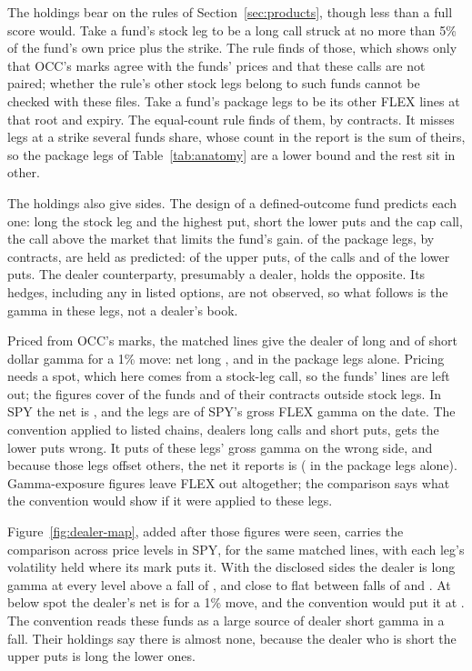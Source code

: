 \documentclass[11pt]{article}
\begin{document}
The holdings bear on the rules of Section~\ref{sec:products}, though less than a full
score would. Take a fund's stock leg to be a long call struck at no more than 5\% of the
fund's own price plus the strike. The rule finds \HoldStockRecall{} of those, which
shows only that OCC's marks agree with the funds' prices and that these calls are not
paired; whether the rule's other stock legs belong to such funds cannot be checked with
these files. Take a fund's package legs to be its other FLEX lines at that root and
expiry. The equal-count rule finds \HoldPackageRecall{} of them, by contracts. It misses
legs at a strike several funds share, whose count in the report is the sum of theirs, so
the package legs of Table~\ref{tab:anatomy} are a lower bound and the rest sit in other.

The holdings also give sides. The design of a defined-outcome fund predicts each one:
long the stock leg and the highest put, short the lower puts and the cap call, the call
above the market that limits the fund's gain. \HoldDesign{} of the package legs, by
contracts, are held as predicted: \HoldDesignUpperPut{} of the upper puts,
\HoldDesignCall{} of the calls and \HoldDesignLowerPut{} of the lower puts. The dealer
counterparty, presumably a dealer, holds the opposite. Its hedges, including any in
listed options, are not observed, so what follows is the gamma in these legs, not a
dealer's book.

Priced from OCC's marks, the matched lines give the dealer \HoldGammaLong{} of long and
\HoldGammaShort{} of short dollar gamma for a 1\% move: net long \HoldGammaNet{}, and
\HoldPackageGammaNet{} in the package legs alone. Pricing needs a spot, which here comes
from a stock-leg call, so the funds' \HoldUnpriced{} lines are left out; the figures cover
\HoldCoverageFunds{} of the \HoldFlexFunds{} funds and \HoldCoverageContracts{} of their
contracts outside stock legs. In SPY the net is \HoldGammaSPYNet{}, and the legs are
\HoldGammaSPYShare{} of SPY's gross FLEX gamma on the date. The convention applied to
listed chains, dealers long calls and short puts, gets the lower puts wrong. It puts
\HoldGammaWrong{} of these legs' gross gamma on the wrong side, and because those legs
offset others, the net it reports is \HoldGammaConventionNet{} (\HoldPackageGammaConventionNet{}
in the package legs alone). Gamma-exposure figures leave FLEX out altogether; the
comparison says what the convention would show if it were applied to these legs.

Figure~\ref{fig:dealer-map}, added after those figures were seen, carries the comparison
across price levels in SPY, for the same matched lines, with each leg's volatility held
where its mark puts it. With the disclosed sides the dealer is long gamma at every level
above a fall of \HoldProfileShortFrom{}, and close to flat between falls of
\HoldProfileShortFrom{} and \HoldProfileShortTo{}. At \HoldProfileDrop{} below spot the
dealer's net is \HoldProfileDropDealer{} for a 1\% move, and the convention would put it
at \HoldProfileDropConvention{}. The convention reads these funds as a large source of
dealer short gamma in a fall. Their holdings say there is almost none, because the dealer
who is short the upper puts is long the lower ones.
\end{document}
